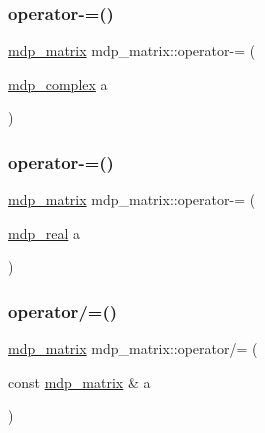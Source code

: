 \mbox{\label{classmdp__matrix_a5512747a08a90de54f0291bb86fd3b53}} 
\subsubsection{\texorpdfstring{operator-\/=()}{operator-=()}\hspace{0.1cm}{\footnotesize\ttfamily [2/3]}}
{\footnotesize\ttfamily \hyperlink{classmdp__matrix}{mdp\+\_\+matrix} mdp\+\_\+matrix\+::operator-\/= (\begin{DoxyParamCaption}\item[{\hyperlink{classmdp__complex}{mdp\+\_\+complex}}]{a }\end{DoxyParamCaption})\hspace{0.3cm}{\ttfamily [inline]}}

\mbox{\label{classmdp__matrix_a2b4c3da54d025ee8d8b48acfc8cc4702}} 
\subsubsection{\texorpdfstring{operator-\/=()}{operator-=()}\hspace{0.1cm}{\footnotesize\ttfamily [3/3]}}
{\footnotesize\ttfamily \hyperlink{classmdp__matrix}{mdp\+\_\+matrix} mdp\+\_\+matrix\+::operator-\/= (\begin{DoxyParamCaption}\item[{\hyperlink{mdp__global__vars_8h_a69d96b74c791e0bbdb888b3913a69450}{mdp\+\_\+real}}]{a }\end{DoxyParamCaption})\hspace{0.3cm}{\ttfamily [inline]}}

\mbox{\label{classmdp__matrix_a0c1945c09ca3bea26e1096253b49a25d}} 
\subsubsection{\texorpdfstring{operator/=()}{operator/=()}\hspace{0.1cm}{\footnotesize\ttfamily [1/3]}}
{\footnotesize\ttfamily \hyperlink{classmdp__matrix}{mdp\+\_\+matrix} mdp\+\_\+matrix\+::operator/= (\begin{DoxyParamCaption}\item[{const \hyperlink{classmdp__matrix}{mdp\+\_\+matrix} \&}]{a }\end{DoxyParamCaption})\hspace{0.3cm}{\ttfamily [inline]}}

